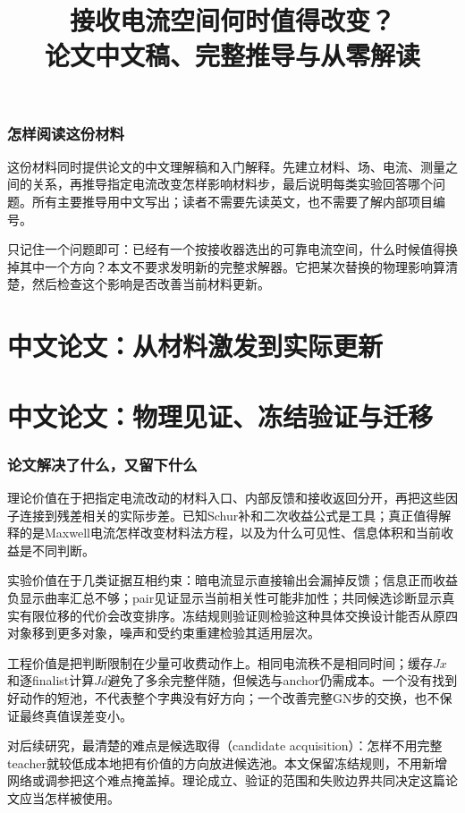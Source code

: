 \documentclass[UTF8,a4paper,11pt,fontset=none]{ctexart}
\title{接收电流空间何时值得改变？\\论文中文稿、完整推导与从零解读}\author{}\date{}
\begin{document}
\maketitle

\section*{怎样阅读这份材料}
这份材料同时提供论文的中文理解稿和入门解释。先建立材料、场、电流、测量之间的关系，再推导指定电流改变怎样影响材料步，最后说明每类实验回答哪个问题。所有主要推导用中文写出；读者不需要先读英文，也不需要了解内部项目编号。

只记住一个问题即可：已经有一个按接收器选出的可靠电流空间，什么时候值得换掉其中一个方向？本文不要求发明新的完整求解器。它把某次替换的物理影响算清楚，然后检查这个影响是否改善当前材料更新。
\setcounter{tocdepth}{1}\tableofcontents\clearpage


\clearpage\part{中文论文：从材料激发到实际更新}



\clearpage\part{中文论文：物理见证、冻结验证与迁移}


\clearpage
\section{论文解决了什么，又留下什么}
理论价值在于把指定电流改动的材料入口、内部反馈和接收返回分开，再把这些因子连接到残差相关的实际步差。已知Schur补和二次收益公式是工具；真正值得解释的是Maxwell电流怎样改变材料法方程，以及为什么可见性、信息体积和当前收益是不同判断。

实验价值在于几类证据互相约束：暗电流显示直接输出会漏掉反馈；信息正而收益负显示曲率汇总不够；pair见证显示当前相关性可能非加性；共同候选诊断显示真实有限位移的代价会改变排序。冻结规则验证则检验这种具体交换设计能否从原四对象移到更多对象，噪声和受约束重建检验其适用层次。

工程价值是把判断限制在少量可收费动作上。相同电流秩不是相同时间；缓存$Jx$和逐finalist计算$Jd$避免了多余完整伴随，但候选与anchor仍需成本。一个没有找到好动作的短池，不代表整个字典没有好方向；一个改善完整GN步的交换，也不保证最终真值误差变小。

对后续研究，最清楚的难点是候选取得（candidate acquisition）：怎样不用完整teacher就较低成本地把有价值的方向放进候选池。本文保留冻结规则，不用新增网络或调参把这个难点掩盖掉。理论成立、验证的范围和失败边界共同决定这篇论文应当怎样被使用。
\clearpage{\small\setlength{\parskip}{0pt}}
\end{document}
